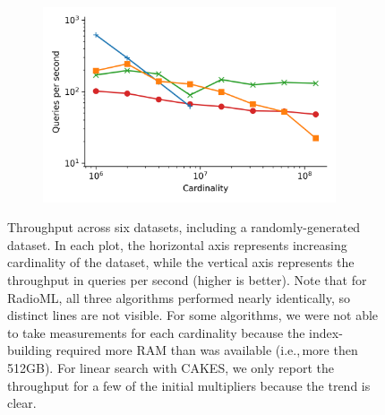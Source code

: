 \begin{figure}
\begin{subfigure}[b]{0.47\textwidth}
        \label{fig:results:radioml-scaling}
    \end{subfigure}%
    \vspace{1em}
    \begin{subfigure}[b]{0.47\textwidth}
        \includegraphics[width=0.95\textwidth]{plots/sift_PermutedBall_10_throughput.png}
        \label{fig:results:silva-scaling}
    \end{subfigure}%
    \caption{Throughput across six datasets, including a randomly-generated dataset.
    In each plot, the horizontal axis represents increasing cardinality of the dataset, while the vertical axis represents the throughput in queries per second (higher is better).
    Note that for RadioML, all three algorithms performed nearly identically, so distinct lines are not visible.
    For some algorithms, we were not able to take measurements for each cardinality because the index-building required more RAM than was available (i.e.,\,more then 512GB).
    For linear search with CAKES, we only report the throughput for a few of the initial multipliers because the trend is clear.}
    \label{fig:results:scaling-plots}
\end{figure}


